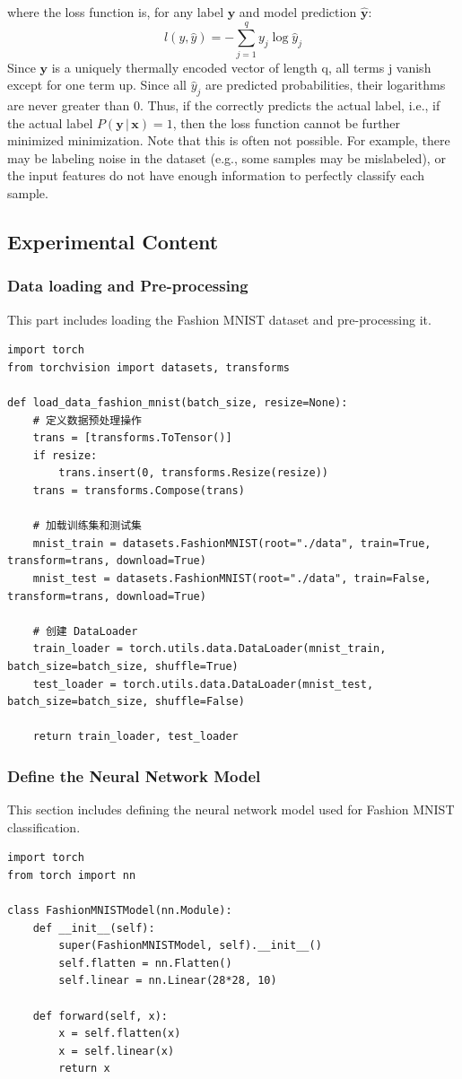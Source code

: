 \documentclass[a4paper,12pt]{article}
\begin{document}
where the loss function is, for any label $\mathbf{y}$ and model prediction $\hat{\mathbf{y}}$:
\begin{equation}
l(y, \hat{y}) = - \sum_{j=1}^{q} y_j \log \hat{y}_j
\end{equation}
Since $\mathbf{y}$ is a uniquely thermally encoded vector of length q, all terms j vanish except for one term
up. Since all $\hat{y}_j$ are predicted probabilities, their logarithms are never greater than 0. Thus, if the
correctly predicts the actual label, i.e., if the actual label $P(\mathbf{y} \,| \, \mathbf{x}) = 1$, then the loss function cannot be further minimized
minimization. Note that this is often not possible. For example, there may be labeling noise in the dataset (e.g., some samples
may be mislabeled), or the input features do not have enough information to perfectly classify each sample.

\subsection{Experimental Content}
\subsubsection{Data loading and Pre-processing}
This part includes loading the Fashion MNIST dataset and pre-processing it.
\begin{lstlisting}
import torch
from torchvision import datasets, transforms

def load_data_fashion_mnist(batch_size, resize=None):
    # 定义数据预处理操作
    trans = [transforms.ToTensor()]
    if resize:
        trans.insert(0, transforms.Resize(resize))
    trans = transforms.Compose(trans)

    # 加载训练集和测试集
    mnist_train = datasets.FashionMNIST(root="./data", train=True, transform=trans, download=True)
    mnist_test = datasets.FashionMNIST(root="./data", train=False, transform=trans, download=True)

    # 创建 DataLoader
    train_loader = torch.utils.data.DataLoader(mnist_train, batch_size=batch_size, shuffle=True)
    test_loader = torch.utils.data.DataLoader(mnist_test, batch_size=batch_size, shuffle=False)

    return train_loader, test_loader
\end{lstlisting}

\subsubsection{Define the Neural Network Model}
This section includes defining the neural network model used for Fashion MNIST classification.
\begin{lstlisting}
import torch
from torch import nn

class FashionMNISTModel(nn.Module):
    def __init__(self):
        super(FashionMNISTModel, self).__init__()
        self.flatten = nn.Flatten()
        self.linear = nn.Linear(28*28, 10)

    def forward(self, x):
        x = self.flatten(x)
        x = self.linear(x)
        return x

\end{lstlisting}
\end{document}
